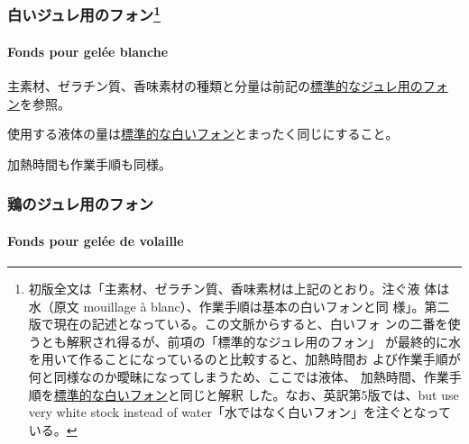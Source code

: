 \begin{recette}
\maeaki

\hypertarget{ux767dux3044ux30b8ux30e5ux30ecux7528ux306eux30d5ux30a9ux30f310}{%
\subsubsection[白いジュレ用のフォン]{\texorpdfstring{白いジュレ用のフォン\footnote{初版全文は「主素材、ゼラチン質、香味素材は上記のとおり。注ぐ液
  体は水（原文 mouillage à blanc）、作業手順は基本の白いフォンと同
  様」。第二版で現在の記述となっている。この文脈からすると、白いフォ
  ンの二番を使うとも解釈され得るが、前項の「標準的なジュレ用のフォン」
  が最終的に水を用いて作ることになっているのと比較すると、加熱時間お
  よび作業手順が何と同様なのか曖昧になってしまうため、ここでは液体、
  加熱時間、作業手順を\protect\hyperlink{fonds-blanc}{標準的な白いフォン}と同じと解釈
  した。なお、英訳第5版では、but use very white stock instead of
  water「水ではなく白いフォン」を注ぐとなっている。}}{白いジュレ用のフォン}}\label{ux767dux3044ux30b8ux30e5ux30ecux7528ux306eux30d5ux30a9ux30f310}}

\hypertarget{fonds-pour-gelee-blanche}{%
\paragraph{Fonds pour gelée blanche}\label{fonds-pour-gelee-blanche}}


主素材、ゼラチン質、香味素材の種類と分量は前記の\protect\hyperlink{fonds-pour-gelee-ordinaire}{標準的なジュレ用のフォ
ン}を参照。

使用する液体の量は\protect\hyperlink{fonds-blanc}{標準的な白いフォン}とまったく同じにすること。

加熱時間も作業手順も同様。

\maeaki

\hypertarget{ux9d8fux306eux30b8ux30e5ux30ecux7528ux306eux30d5ux30a9ux30f3}{%
\subsubsection{鶏のジュレ用のフォン}\label{ux9d8fux306eux30b8ux30e5ux30ecux7528ux306eux30d5ux30a9ux30f3}}

\hypertarget{fonds-pour-gelee-de-volaille}{%
\paragraph{Fonds pour gelée de
volaille}\label{fonds-pour-gelee-de-volaille}}


\end{recette}

